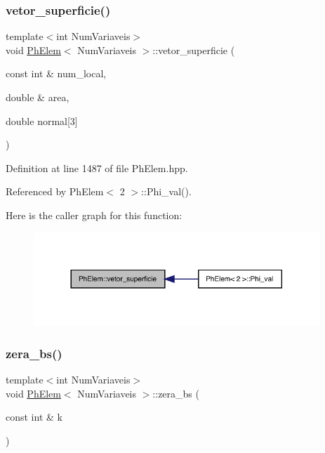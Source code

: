 \subsubsection{\texorpdfstring{vetor\+\_\+superficie()}{vetor\_superficie()}}
{\footnotesize\ttfamily template$<$int Num\+Variaveis$>$ \\
void \hyperlink{classPhElem}{Ph\+Elem}$<$ Num\+Variaveis $>$\+::vetor\+\_\+superficie (\begin{DoxyParamCaption}\item[{const int \&}]{num\+\_\+local,  }\item[{double \&}]{area,  }\item[{double}]{normal\mbox{[}3\mbox{]} }\end{DoxyParamCaption})}



Definition at line 1487 of file Ph\+Elem.\+hpp.



Referenced by Ph\+Elem$<$ 2 $>$\+::\+Phi\+\_\+val().

Here is the caller graph for this function\+:
\nopagebreak
\begin{figure}[H]
\begin{center}
\leavevmode
\includegraphics[width=305pt]{classPhElem_a993d5f1b66f6d99ffb95adc9ff882e80_icgraph}
\end{center}
\end{figure}
\mbox{\label{classPhElem_a55ef84501df0d4e8aec6d49846e21237}} 
\subsubsection{\texorpdfstring{zera\+\_\+bs()}{zera\_bs()}}
{\footnotesize\ttfamily template$<$int Num\+Variaveis$>$ \\
void \hyperlink{classPhElem}{Ph\+Elem}$<$ Num\+Variaveis $>$\+::zera\+\_\+bs (\begin{DoxyParamCaption}\item[{const int \&}]{k }\end{DoxyParamCaption})}



